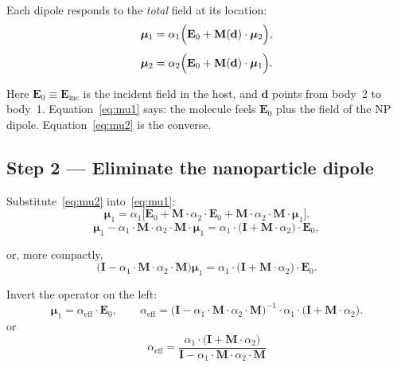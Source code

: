 \documentclass[11pt,a4paper]{article}
\theoremstyle{definition}
\newcommand{\alphaeff}{\alpha_{\mathrm{eff}}}
\newcommand{\Einc}{\mathbf{E}_{\mathrm{inc}}}
\newcommand{\I}{\mathbf{I}}
\begin{document}
\noindent
Each dipole responds to the \emph{total} field at its location:
\begin{align}
  \boldsymbol{\mu}_1
  &=
  \alpha_1\Bigl(
    \mathbf{E}_0
    +
    \mathbf{M}(\mathbf{d})\cdot\boldsymbol{\mu}_2
  \Bigr),
  \label{eq:mu1}\\[0.4em]
  \boldsymbol{\mu}_2
  &=
  \alpha_2\Bigl(
    \mathbf{E}_0
    +
    \mathbf{M}(\mathbf{d})\cdot\boldsymbol{\mu}_1
  \Bigr).
  \label{eq:mu2}
\end{align}

\noindent
Here $\mathbf{E}_0\equiv\Einc$ is the incident field in the host, and $\mathbf{d}$ points from body~2 to body~1. Equation~\eqref{eq:mu1} says: the molecule feels $\mathbf{E}_0$ plus the field of the NP dipole. Equation~\eqref{eq:mu2} is the converse.

\subsection{Step 2 --- Eliminate the nanoparticle dipole}

\noindent
Substitute~\eqref{eq:mu2} into~\eqref{eq:mu1}:
\begin{equation}
  \boldsymbol{\mu}_1
  =
  \alpha_1\Biggl[
    \mathbf{E}_0
    +
    \mathbf{M}\cdot\alpha_2\cdot\mathbf{E}_0
    +
    \mathbf{M}\cdot\alpha_2\cdot\mathbf{M}\cdot\boldsymbol{\mu}_1
  \Biggr].
  \label{eq:sub}
\end{equation}
\begin{equation}
  \boldsymbol{\mu}_1
  -
  \alpha_1\cdot\mathbf{M}\cdot\alpha_2\cdot\mathbf{M}\cdot\boldsymbol{\mu}_1
  =
  \alpha_1\cdot\bigl(\I + \mathbf{M}\cdot\alpha_2\bigr)\cdot\mathbf{E}_0,
\end{equation}

\noindent
or, more compactly,
\begin{equation}
  \bigl(
    \I
    -
    \alpha_1\cdot\mathbf{M}\cdot\alpha_2\cdot\mathbf{M}
  \bigr)
  \boldsymbol{\mu}_1
  =
  \alpha_1\cdot\bigl(\I + \mathbf{M}\cdot\alpha_2\bigr)\cdot\mathbf{E}_0.
  \label{eq:operator}
\end{equation}

\noindent
Invert the operator on the left:
\begin{equation}
  \boldsymbol{\mu}_1
  =
  \alphaeff\cdot\mathbf{E}_0,
  \qquad
  \alphaeff
  =
  \bigl(
    \I
    -
    \alpha_1\cdot\mathbf{M}\cdot\alpha_2\cdot\mathbf{M}
  \bigr)^{-1}
  \cdot
  \alpha_1\cdot\bigl(\I + \mathbf{M}\cdot\alpha_2\bigr).
\end{equation}
\noindent 
or 
\begin{equation}
  \alphaeff
  =
  \frac{\alpha_1\cdot\bigl(\I + \mathbf{M}\cdot\alpha_2\bigr)}{\I - \alpha_1\cdot\mathbf{M}\cdot\alpha_2\cdot\mathbf{M}}
\end{equation}
\end{document}
